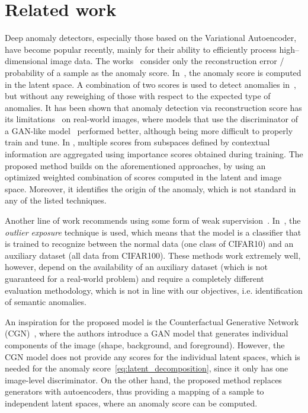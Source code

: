 \section{Related work} \label{sec:related_work}
Deep anomaly detectors, especially those based on the Variational Autoencoder, have become popular recently, mainly for their ability to efficiently process high--dimensional image data. The works~\cite{an2015variational, xu2018unsupervised, nguyen2019gee, wang2020advae, shaalan2021detecting, kieu2022anomaly} consider only the reconstruction error / probability of a sample as the anomaly score. In~\cite{sun2018learning, zong2018deep, ruff2019deep}, the anomaly score is computed in the latent space. A combination of two scores is used to detect anomalies in~\cite{zimmerer2018context, akccay2019skip}, but without any reweighing of those with respect to the expected type of anomalies. It has been shown that anomaly detection via reconstruction score has its limitations~\cite{larsen2016autoencoding, vskvara2021comparison} on real-world images, where models that use the discriminator of a GAN-like model~\cite{schlegl2017unsupervised, schleglFAnoGANFastUnsupervised2019, akcay2018ganomaly, perera2019ocgan, ravanbakhsh2017abnormal, liu2019mogaal, zenati2018adversarially} performed better, although being more difficult to properly train and tune. In \cite{calikus2022wisdom}, multiple scores from subspaces defined by contextual information are aggregated using importance scores obtained during training. The proposed method builds on the aforementioned approaches, by using an optimized weighted combination of scores computed in the latent and image space. Moreover, it identifies the origin of the anomaly, which is not standard in any of the listed techniques.

Another line of work recommends using some form of weak supervision~\cite{hendrycks2018deep, deecke2021transfer}. In~\cite{deecke2021transfer}, the \textit{outlier exposure} technique is used, which means that the model is a classifier that is trained to recognize between the normal data (one class of CIFAR10) and an auxiliary dataset (all data from CIFAR100). These methods work extremely well, however, depend on the availability of an auxiliary dataset (which is not guaranteed for a real-world problem) and require a completely different evaluation methodology, which is not in line with our objectives, i.e. identification of semantic anomalies.

An inspiration for the proposed model is the Counterfactual Generative Network (CGN)~\cite{sauer2021counterfactual}, where the authors introduce a GAN model that generates individual components of the image (shape, background, and foreground). However, the CGN model does not provide any scores for the individual latent spaces, which is needed for the anomaly score~\eqref{eq:latent_decomposition}, since it only has one image-level discriminator. On the other hand, the proposed method replaces generators with autoencoders, thus providing a mapping of a sample to independent latent spaces, where an anomaly score can be computed.

